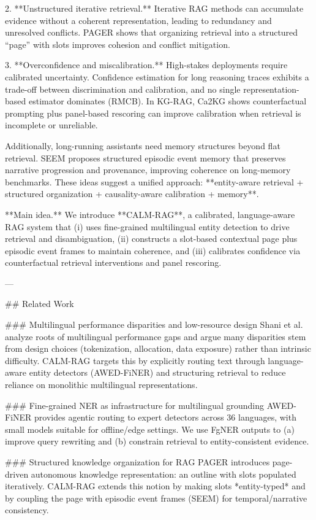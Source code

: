 2. **Unstructured iterative retrieval.** Iterative RAG methods can accumulate evidence without a coherent representation, leading to redundancy and unresolved conflicts. PAGER shows that organizing retrieval into a structured “page” with slots improves cohesion and conflict mitigation.

3. **Overconfidence and miscalibration.** High-stakes deployments require calibrated uncertainty. Confidence estimation for long reasoning traces exhibits a trade-off between discrimination and calibration, and no single representation-based estimator dominates (RMCB). In KG-RAG, Ca2KG shows counterfactual prompting plus panel-based rescoring can improve calibration when retrieval is incomplete or unreliable.

Additionally, long-running assistants need memory structures beyond flat retrieval. SEEM proposes structured episodic event memory that preserves narrative progression and provenance, improving coherence on long-memory benchmarks. These ideas suggest a unified approach: **entity-aware retrieval + structured organization + causality-aware calibration + memory**.

**Main idea.** We introduce **CALM-RAG**, a calibrated, language-aware RAG system that (i) uses fine-grained multilingual entity detection to drive retrieval and disambiguation, (ii) constructs a slot-based contextual page plus episodic event frames to maintain coherence, and (iii) calibrates confidence via counterfactual retrieval interventions and panel rescoring.

---

## Related Work  

### Multilingual performance disparities and low-resource design  
Shani et al. analyze roots of multilingual performance gaps and argue many disparities stem from design choices (tokenization, allocation, data exposure) rather than intrinsic difficulty. CALM-RAG targets this by explicitly routing text through language-aware entity detectors (AWED-FiNER) and structuring retrieval to reduce reliance on monolithic multilingual representations.

### Fine-grained NER as infrastructure for multilingual grounding  
AWED-FiNER provides agentic routing to expert detectors across 36 languages, with small models suitable for offline/edge settings. We use FgNER outputs to (a) improve query rewriting and (b) constrain retrieval to entity-consistent evidence.

### Structured knowledge organization for RAG  
PAGER introduces page-driven autonomous knowledge representation: an outline with slots populated iteratively. CALM-RAG extends this notion by making slots *entity-typed* and by coupling the page with episodic event frames (SEEM) for temporal/narrative consistency.

